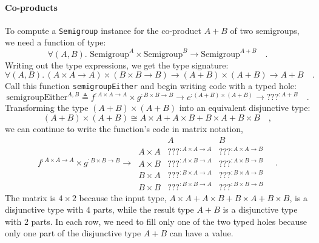 \paragraph{Co-products}

To compute a \lstinline!Semigroup! instance for the co-product $A+B$
of two semigroups, we need a function of type:
\[
\forall(A,B).\,\,\text{Semigroup}^{A}\times\text{Semigroup}^{B}\rightarrow\text{Semigroup}^{A+B}\quad.
\]
Writing out the type expressions, we get the type signature:
\[
\forall(A,B).\,\left(A\times A\rightarrow A\right)\times\left(B\times B\rightarrow B\right)\rightarrow\left(A+B\right)\times\left(A+B\right)\rightarrow A+B\quad.
\]
Call this function \lstinline!semigroupEither! and begin writing
code with a typed hole:
\[
\text{semigroupEither}^{A,B}\triangleq f^{:A\times A\rightarrow A}\times g^{:B\times B\rightarrow B}\rightarrow c^{:\left(A+B\right)\times\left(A+B\right)}\rightarrow\text{???}^{:A+B}\quad.
\]
Transforming the type $\left(A+B\right)\times\left(A+B\right)$ into
an equivalent disjunctive type:
\[
\left(A+B\right)\times\left(A+B\right)\cong A\times A+A\times B+B\times A+B\times B\quad,
\]
we can continue to write the function\textsf{'}s code in matrix notation,
\[
f^{:A\times A\rightarrow A}\times g^{:B\times B\rightarrow B}\rightarrow\,\begin{array}{|c||cc|}
 & A & B\\
\hline A\times A & \text{???}^{:A\times A\rightarrow A} & \text{???}^{:A\times A\rightarrow B}\\
A\times B & \text{???}^{:A\times B\rightarrow A} & \text{???}^{:A\times B\rightarrow B}\\
B\times A & \text{???}^{:B\times A\rightarrow A} & \text{???}^{:B\times A\rightarrow B}\\
B\times B & \text{???}^{:B\times B\rightarrow A} & \text{???}^{:B\times B\rightarrow B}
\end{array}\quad.
\]
The matrix is $4\times2$ because the input type, $A\times A+A\times B+B\times A+B\times B$,
is a disjunctive type with $4$ parts, while the result type $A+B$
is a disjunctive type with $2$ parts. In each row, we need to fill
only one of the two typed holes because only one part of the disjunctive
type $A+B$ can have a value.

